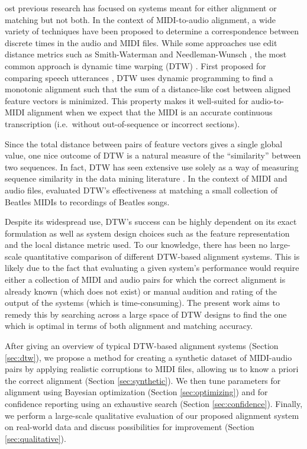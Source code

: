 \documentclass{article}
\begin{document}
ost previous research has focused on systems meant for either alignment or matching but not both.
In the context of MIDI-to-audio alignment, a wide variety of techniques have been proposed to determine a correspondence between discrete times in the audio and MIDI files.
While some approaches use edit distance metrics such as Smith-Waterman \cite{ewert2012towards} and Needleman-Wunsch \cite{grachten2013automatic}, the most common approach is dynamic time warping (DTW) \cite{muller2007dynamic}.
First proposed for comparing speech utterances \cite{sakoe1978dynamic}, DTW uses dynamic programming to find a monotonic alignment such that the sum of a distance-like cost between aligned feature vectors is minimized.
This property makes it well-suited for audio-to-MIDI alignment when we expect that the MIDI is an accurate continuous transcription (i.e.\ without out-of-sequence or incorrect sections).

Since the total distance between pairs of feature vectors gives a single global value, one nice outcome of DTW is a natural measure of the ``similarity'' between two sequences.
In fact, DTW has seen extensive use solely as a way of measuring sequence similarity in the data mining literature \cite{berndt1994using}.
In the context of MIDI and audio files, \cite{hu2003polyphonic} evaluated DTW's effectiveness at matching a small collection of Beatles MIDIs to recordings of Beatles songs.

Despite its widespread use, DTW's success can be highly dependent on its exact formulation as well as system design choices such as the feature representation and the local distance metric used.
To our knowledge, there has been no large-scale quantitative comparison of different DTW-based alignment systems.
This is likely due to the fact that evaluating a given system's performance would require either a collection of MIDI and audio pairs for which the correct alignment is already known (which does not exist) or manual audition and rating of the output of the systems (which is time-consuming).
The present work aims to remedy this by searching across a large space of DTW designs to find the one which is optimal in terms of both alignment and matching accuracy.

After giving an overview of typical DTW-based alignment systems (Section \ref{sec:dtw}), we propose a method for creating a synthetic dataset of MIDI-audio pairs by applying realistic corruptions to MIDI files, allowing us to know a priori the correct alignment (Section \ref{sec:synthetic}).
We then tune parameters for alignment using Bayesian optimization (Section \ref{sec:optimizing}) and for confidence reporting using an exhaustive search (Section \ref{sec:confidence}).
Finally, we perform a large-scale qualitative evaluation of our proposed alignment system on real-world data and discuss possibilities for improvement (Section \ref{sec:qualitative}).
\end{document}
